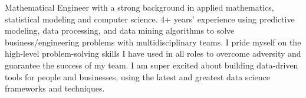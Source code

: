 

\begin{cvparagraph}



Mathematical Engineer with a strong background in applied mathematics, statistical modeling and computer science. 
4+ years’ experience using predictive modeling, data processing, and data mining algorithms to solve business/engineering
problems with multidisciplinary teams. I pride myself on the high-level problem-solving skills I have used in all roles to
overcome adversity and guarantee the success of my team. I am super excited about building data-driven tools for people and
businesses, using the latest and greatest data science frameworks and techniques.
\end{cvparagraph}
